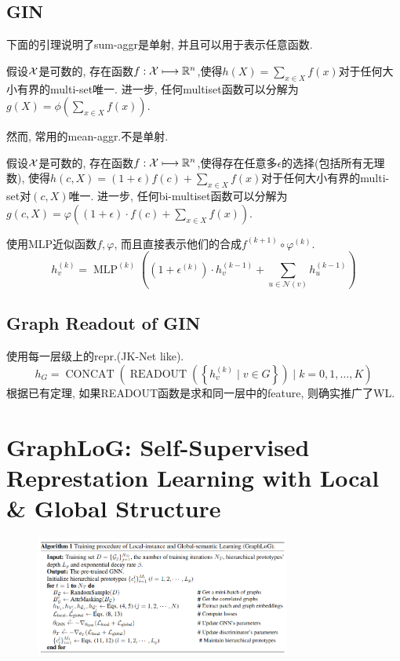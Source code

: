 \documentclass{article}
\begin{document}
\subsection{GIN}

下面的引理说明了sum-aggr是单射, 并且可以用于表示任意函数.
\begin{lemma}
    假设$\cal{X}$是可数的, 存在函数$f:\cal{X}\longmapsto \R^n$,使得$h(X)=\sum_{x\in X} f(x)$对于任何大小有界的multi-set唯一. 进一步, 任何multiset函数可以分解为$g(X)=\phi\left(\sum_{x \in X} f(x)\right)$.
\end{lemma}
然而, 常用的mean-aggr.不是单射.

\begin{corollary}
    假设$\cal{X}$是可数的, 存在函数$f:\cal{X}\longmapsto \R^n$,使得存在任意多$\epsilon$的选择(包括所有无理数), 使得$h(c, X)=(1+\epsilon)f(c)+\sum_{x\in X} f(x)$对于任何大小有界的multi-set对$(c, X)$唯一. 进一步, 任何bi-multiset函数可以分解为$g(c, X)=\varphi\left((1+\epsilon) \cdot f(c)+\sum_{x \in X} f(x)\right)$.
\end{corollary}

使用MLP近似函数$f,\varphi$, 而且直接表示他们的合成$f^{(k+1)} \circ \varphi^{(k)}$.
\begin{equation}
    h_{v}^{(k)}=\operatorname{MLP}^{(k)}\left(\left(1+\epsilon^{(k)}\right) \cdot h_{v}^{(k-1)}+\sum_{u \in \mathcal{N}(v)} h_{u}^{(k-1)}\right)
\end{equation}

\subsection{Graph Readout of GIN}

使用每一层级上的repr.(JK-Net like).
\begin{equation}
    h_{G}=\operatorname{CONCAT}\left(\operatorname{READOUT}\left(\left\{h_{v}^{(k)} \mid v \in G\right\}\right) \mid k=0,1, \ldots, K\right)
\end{equation}
根据已有定理, 如果READOUT函数是求和同一层中的feature, 则确实推广了WL.

\section{GraphLoG: Self-Supervised Represtation Learning with Local \& Global Structure}

\begin{figure}[htbp]
    \centering
    \includegraphics[width=0.75\textwidth]{graphlog-alg.png}
\end{figure}
\end{document}
